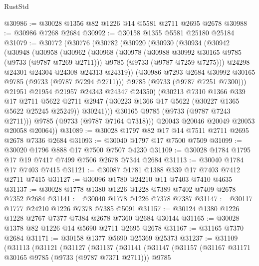 \begin{lexlean}{RustStd}
\begin{coremodule}
{\begin{coremodule}
{{{{{{{{{{{{{{{{{{{{{{{{{{{{{{{{{{{{{{{{{{{{{{{{{{{{{{{@30986 := @30028 @1356 @82 @1226 @14 @5581 @2711 @2695 @2678
@30988 := @30986 @7268 @2684
@30992 := @30158 @1355 @5581 @25180 @25184
@31079 := @30772
    (@30776
      (@30782
        (@30920
          (@30930
            (@30934
              (@30942
                (@30948
                  (@30958
                    (@30962
                      (@30968
                        (@30978
                          (@30988 @30992 @30165 @9785 (@9733 (@9787 @7269 @2711)))
                          @9785
                          (@9733 (@9787 @7259 @7275)))
                        @24298
                        @24301
                        @24304
                        @24308
                        @24313
                        @24319))
                    (@30986 @7293 @2684 @30992 @30165 @9785 (@9733 (@9787 @7294 @2711)))
                    @9785
                    (@9733 (@9787 @7251 @7300)))
                  @21951
                  @21954
                  @21957
                  @24343
                  @24347
                  @24350)
                (@30213
                  @7310
                  @1366
                  @339
                  @17
                  @2711
                  @5622
                  @2711
                  @2947
                  (@30223 @1366 @17 @5622 (@30227 @1365 @5622 @25245 @25249))
                  @30241)))
            @30165
            @9785
            (@9733 (@9787 @7243 @2711)))
          @9785
          (@9733 (@9787 @7164 @7318)))
        @20043
        @20046
        @20049
        @20053
        @20058
        @20064))
@31089 := @30028 @1797 @82 @17 @14 @7511 @2711 @2695 @2678 @7336 @2684
@31093 := @30040 @1797 @17 @7500 @7509
@31099 := @30020 @1796 @888 @17 @7500 @7507 @4230
@31109 := @30028 @1784 @1795 @17 @19 @7417 @7499 @7506 @2678 @7344 @2684
@31113 := @30040 @1784 @17 @7403 @7415
@31121 := @30087 @1781 @1388 @339 @17 @7403 @7412 @2711 @7415
@31127 := @30096 @1780 @24210 @11 @7403 @7410 @4635
@31137 := @30028 @1778 @1380 @1226 @1228 @7389 @7402 @7409 @2678 @7352 @2684
@31141 := @30040 @1778 @1226 @7378 @7387
@31147 := @30117 @1777 @24210 @1226 @7378 @7385 @5091
@31157 := @30124 @1380 @1226 @1228 @2767 @7377 @7384 @2678 @7360 @2684 @30144
@31165 := @30028 @1378 @82 @1226 @14 @5690 @2711 @2695 @2678
@31167 := @31165 @7370 @2684
@31171 := @30158 @1377 @5690 @25369 @25373
@31237 := @31109
    (@31113
      (@31121
        (@31127
          (@31137
            (@31141
              (@31147
                (@31157
                  (@31167 @31171 @30165 @9785 (@9733 (@9787 @7371 @2711)))
                  @9785
}}}}}}}}}}}}}}}}}}}}}}}}}}}}}}}}}}}}}}}}}}}}}}}}}}}}}}}
\end{coremodule}}
\end{coremodule}
\end{lexlean}
